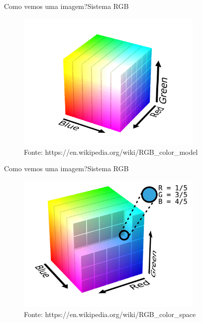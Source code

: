 \documentclass{beamer}
\begin{document}
\begin{frame}{Como vemos uma imagem?}{Sistema {\color{red}R}{\color{green}G}{\color{blue}B}}
    \begin{figure}
        \centering
        \includegraphics[width=0.8\textwidth]{figs/rgb-cube.png}
        \caption{Fonte: https://en.wikipedia.org/wiki/RGB\_color\_model}
    \end{figure}
\end{frame}

\begin{frame}{Como vemos uma imagem?}{Sistema {\color{red}R}{\color{green}G}{\color{blue}B}}
    \begin{figure}
        \centering
        \includegraphics[width=0.8\textwidth]{figs/rgb-point.png}
        \caption{Fonte: https://en.wikipedia.org/wiki/RGB\_color\_space}
    \end{figure}
\end{frame}
\end{document}
